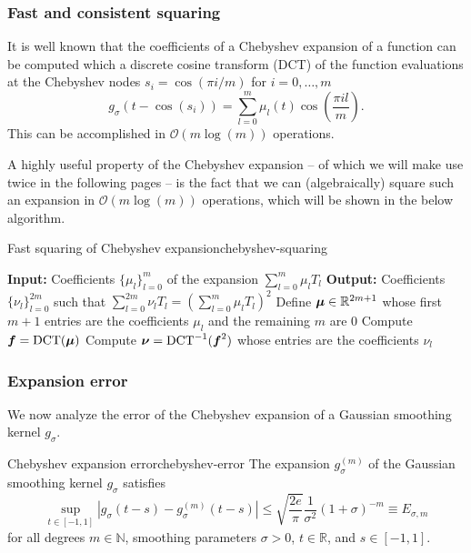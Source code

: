 \documentclass[12pt]{article}
\begin{document}
\subsubsection{Fast and consistent squaring}
\label{subsubsec:dct}

It is well known that the coefficients of a Chebyshev expansion of a function can be computed which a discrete cosine transform (DCT) of the function evaluations at the Chebyshev nodes $s_i = \cos(\pi i / m)$ for $i=0,\dots,m$
\begin{equation}
    g_{\sigma}(t - \cos(s_i)) = \sum_{l=0}^{m} \mu_l(t) \cos\left(\frac{\pi i l}{m} \right).
    \label{equ:discrete-cosine-transform}
\end{equation}
This can be accomplished in $\mathcal{O}(m \log(m))$ operations.

A highly useful property of the Chebyshev expansion -- of which we will make use twice in the following pages -- is the fact that we can (algebraically) square such an expansion in $\mathcal{O}(m \log(m))$ operations, which will be shown in the below algorithm.

\begin{algo}{Fast squaring of Chebyshev expansion}{chebyshev-squaring}
    \begin{algorithmic}[1]
        \Statex \textbf{Input:} Coefficients $\{ \mu_l \}_{l=0}^{m}$ of the expansion $\sum_{l=0}^{m} \mu_l T_l$
        \Statex \textbf{Output:} Coefficients $\{ \nu_l \}_{l=0}^{2m}$ such that $\sum_{l=0}^{2m} \nu_l T_l = (\sum_{l=0}^{m} \mu_l T_l)^2$
        \State Define $\boldsymbol{\mu} \in \mathbb{R}^{2m + 1}$ whose first $m + 1$ entries are the coefficients $\mu_l$ and the remaining $m$ are $0$
    \State Compute $\boldsymbol{f} = \operatorname{DCT}(\boldsymbol{\mu})$
    \State Compute $\boldsymbol{\nu} = \operatorname{DCT}^{-1}(\boldsymbol{f}^{2})$ whose entries are the coefficients $\nu_l$
    \end{algorithmic}
    \end{algo}

\subsubsection{Expansion error}
\label{subsubsec:expansion-error}

We now analyze the error of the Chebyshev expansion of a Gaussian smoothing kernel $g_{\sigma}$.

\begin{lemma}{Chebyshev expansion error}{chebyshev-error}
    The expansion $g_{\sigma}^{(m)}$ of the Gaussian smoothing kernel $g_{{\sigma}}$  satisfies
    \begin{equation}
        \sup_{t \in [-1, 1]} \left| g_{\sigma}(t - s) - g_{\sigma}^{(m)}(t - s) \right| \leq \sqrt{\frac{2e}{\pi}} \frac{1}{\sigma^2} (1 + \sigma)^{-m} \equiv E_{\sigma, m}
        \label{equ:2-chebyshev-interpolation-sup-error-kernel}
    \end{equation}
    for all degrees $m \in \mathbb{N}$, smoothing parameters $\sigma > 0$, $t \in \mathbb{R}$, and $s \in [-1, 1]$.
\end{lemma}
\end{document}
